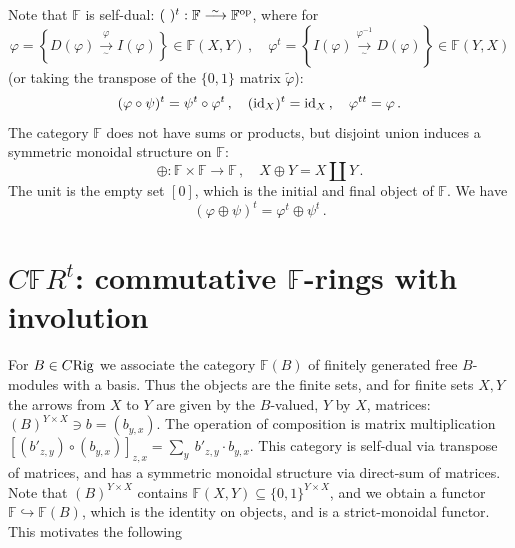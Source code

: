 \documentclass[leqno]{article}
\numberwithin{equation}{section}
\begin{document}
\smallskip

Note that ${\mathbb F}$ is self-dual: $( \ )^t : {\mathbb F} \overset{_\sim}{\longrightarrow} {\mathbb F}^{\rm op}$, where for
$$
\varphi = \left\{ D(\varphi) \underset{^\sim}{\overset{\varphi}{\longrightarrow}} I(\varphi) \right\} \in {\mathbb F} (X,Y) \, , \quad \varphi^t = \left\{ I(\varphi) \underset{^\sim}{\overset{\varphi^{-1}}{\longrightarrow}} D(\varphi) \right\} \in {\mathbb F} (Y,X) 
$$
(or taking the transpose of the $\{0,1\}$ matrix $\widetilde\varphi$):
\begin{equation}
\label{eq14}
(\varphi \circ \psi)^t = \psi^t \circ \varphi^t \, , \quad ({\rm id}_X)^t = {\rm id}_X \, , \quad \varphi^{tt} = \varphi \, .
\end{equation}
The category ${\mathbb F}$ does not have sums or products, but disjoint union induces a symmetric monoidal structure on ${\mathbb F}$:
\begin{equation}
\label{eq15}
\oplus : {\mathbb F} \times {\mathbb F} \to {\mathbb F} \, , \quad X \oplus Y = X \amalg Y \, .
\end{equation}
The unit is the empty set $[0]$, which is the initial and final object of ${\mathbb F}$. We have
\begin{equation}
\label{eq16}
(\varphi \oplus \psi)^t = \varphi^t \oplus \psi^t \, .
\end{equation}


\section{$C{\mathbb F} R^t$: commutative ${\mathbb F}$-rings with involution}

For $B \in C{\rm Rig}$ we associate the category ${\mathbb F} (B)$ of finitely generated free $B$-modules with a basis. Thus the objects are the finite sets, and for finite sets $X,Y$ the arrows from $X$ to $Y$ are given by the $B$-valued, $Y$ by $X$, matrices: $(B)^{Y \times X} \ni b = (b_{y,x})$. The operation of composition is matrix multiplication $\left[ (b'_{z,y}) \circ (b_{y,x}) \right]_{z,x} = \underset{y}{\sum} \ b'_{z,y} \cdot b_{y,x}$. This category is self-dual via transpose of matrices, and has a symmetric monoidal structure via direct-sum of matrices. Note that $(B)^{Y \times X}$ contains ${\mathbb F} (X,Y) \subseteq \{0,1\}^{Y \times X}$, and we obtain a functor ${\mathbb F} \hookrightarrow {\mathbb F}(B)$, which is the identity on objects, and is a strict-monoidal functor. This motivates the following
\end{document}
